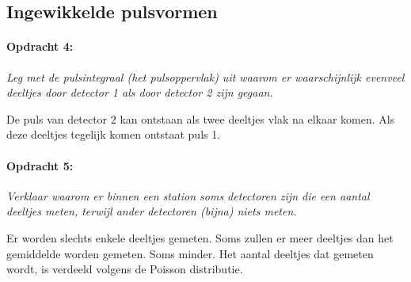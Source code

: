 \subsection{Ingewikkelde pulsvormen}

\begin{minipage}[t]{1\columnwidth}%

\paragraph{Opdracht 4:}

\textit{Leg met de pulsintegraal (het pulsoppervlak) uit waarom er
waarschijnlijk evenveel deeltjes door detector 1 als door detector
2 zijn gegaan.}

De puls van detector 2 kan ontstaan als twee deeltjes vlak na elkaar
komen. Als deze deeltjes tegelijk komen ontstaat puls 1.

\end{minipage}

\begin{minipage}[t]{1\columnwidth}%

\paragraph{Opdracht 5:}

\textit{Verklaar waarom er binnen een station soms detectoren zijn
die een aantal deeltjes meten, terwijl ander detectoren (bijna) niets
meten.}

Er worden slechts enkele deeltjes gemeten. Soms zullen er meer deeltjes
dan het gemiddelde worden gemeten. Soms minder. Het aantal deeltjes
dat gemeten wordt, is verdeeld volgens de Poisson distributie.

\end{minipage}

